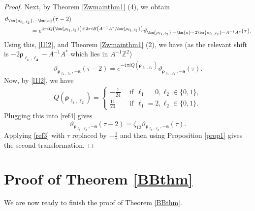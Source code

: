 \documentclass[12pt,reqno]{amsart}
\renewcommand{\t}{\tau}
\newcommand{\z}{\zeta}
\renewcommand{\(}{\left\(}
\renewcommand{\)}{\right\)}
\newcommand{\os}[2]{\overset{#1}{#2}}
\numberwithin{equation}{section}
\theoremstyle{plain}
\theoremstyle{definition}
\numberwithin{equation}{section}
\begin{document}
\begin{proof}
 Next, by Theorem \ref{Zwmainthm1} (4), we obtain 
\begin{align*}%
&\vartheta_{\bm{\rho_{\ell_1,\ell_2}},-\bm{a}}(\t-2)\nonumber\\
&\hspace{1.5cm}=e^{4\pi i Q\left(\bm{\rho_{\ell_1,\ell_2}}\right)+2\pi i B\left(A^{-1}A^*,\bm{\rho_{\ell_1,\ell_2}}\right)}\vartheta_{\bm{\rho_{\ell_1,\ell_2}},-\bm{a}-2\bm{\rho_{\ell_1,\ell_2}}-A^{-1}A^*}(\t).
\end{align*}
Using this, \eqref{l1l2}, and Theorem \ref{Zwmainthm1} (2), we have (as the relevant shift is $-2\bm{\rho_{\ell_1,\ell_2}}-A^{-1}A^{*}$ which lies in $A^{-1}\mathbb{Z}^2$)
\begin{equation}\label{ref4}
\vartheta_{\bm{\rho_{\ell_1,\ell_2}},-\bm{a}}(\t-2)=e^{-4\pi i Q\left(\bm{\rho_{\ell_1,\ell_2}}\right)}\vartheta_{\bm{\rho_{\ell_1,\ell_2}},-\bm{a}}(\t).
\end{equation}
Now, by \eqref{l1l2}, we have 
\begin{align*}
Q\left(\bm{\rho_{\ell_1,\ell_2}}\right)%
=\begin{cases}
-\frac{1}{24}\ \ &\text{if}\ \ \ell_1=0, \ell_2\in\{0,1\},\\
\frac{11}{24}\ \ &\text{if}\ \ \ell_1=2, \ell_2\in\{0,1\}.
\end{cases}
\end{align*}
Plugging this into \eqref{ref4} gives 
\begin{equation*}%
\vartheta_{\bm{\rho_{\ell_1,\ell_2}},-\bm{a}}(\t-2)=\z_{12}\vartheta_{\bm{\rho_{\ell_1,\ell_2}},-\bm{a}}(\t).
\end{equation*}
 Applying \eqref{ref3} with $\t$ replaced by $-\frac{1}{\t}$ and then using Proposition \ref{prop1} gives the second transformation.\qedhere 
\end{proof}








\section{Proof of Theorem \ref{BBthm}}\label{sec5}

We are now ready to finish the proof of Theorem \ref{BBthm}.
\end{document}

